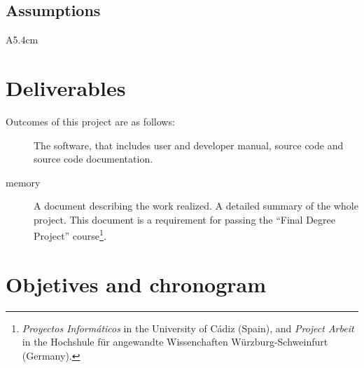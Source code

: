 \documentclass[twocolumn]{article}
\begin{document}
\subsection{Assumptions}
\begin{condlist}{A}{5.4cm}
\end{condlist}

\section{Deliverables}
Outcomes of this project are as follows:

\begin{description}
  \item[\fav] The \fav software, that includes user and developer
    manual, source code and source code documentation.
  \item[\favp memory] A document describing the work realized. A
    detailed summary of the whole project. This document is a
    requirement for passing the ``Final Degree Project''
    course\footnote{\textit{Proyectos Informáticos} in the University
      of Cádiz (Spain), and \textit{Project Arbeit} in the Hochshule
      für angewandte Wissenchaften Würzburg-Schweinfurt (Germany).}.
\end{description}

\section{Objetives and chronogram}
\end{document}
